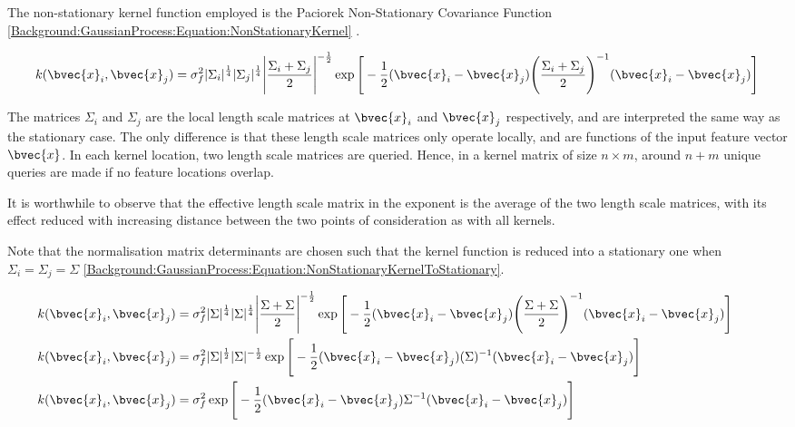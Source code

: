 				The non-stationary kernel function employed is the Paciorek Non-Stationary Covariance Function \eqref{Background:GaussianProcess:Equation:NonStationaryKernel} \citep{AdaptiveNonStationaryKernel}.
				
				\begin{equation}
					k(\bvec{x}_{i}, \bvec{x}_{j}) = \sigma_{f}^{2} |\Sigma_{i}|^{\frac{1}{4}} |\Sigma_{j}|^{\frac{1}{4}} \Bigg|\frac{\Sigma_{i} + \Sigma_{j}}{2}\Bigg|^{-\frac{1}{2}} \exp\Bigg[ -\frac{1}{2} (\bvec{x}_{i} - \bvec{x}_{j}) \Bigg(\frac{\Sigma_{i} + \Sigma_{j}}{2}\Bigg)^{-1} (\bvec{x}_{i} - \bvec{x}_{j}) \Bigg]
				\label{Background:GaussianProcess:Equation:NonStationaryKernel}
				\end{equation}			
				
				The matrices $\Sigma_{i}$ and $\Sigma_{j}$ are the local length scale matrices at $\bvec{x}_{i}$ and $\bvec{x}_{j}$ respectively, and are interpreted the same way as the stationary case. The only difference is that these length scale matrices only operate locally, and are functions of the input feature vector $\bvec{x}$. In each kernel location, two length scale matrices are queried. Hence, in a kernel matrix of size $n \times m$, around $n + m$ unique queries are made if no feature locations overlap.
				
				It is worthwhile to observe that the effective length scale matrix in the exponent is the average of the two length scale matrices, with its effect reduced with increasing distance between the two points of consideration as with all kernels.
				
				Note that the normalisation matrix determinants are chosen such that the kernel function is reduced into a stationary one when $\Sigma_{i} = \Sigma_{j} = \Sigma$ \eqref{Background:GaussianProcess:Equation:NonStationaryKernelToStationary}. 
				
				\begin{equation}
					\left.
						\begin{aligned}
							k(\bvec{x}_{i}, \bvec{x}_{j}) &= \sigma_{f}^{2} |\Sigma|^{\frac{1}{4}} |\Sigma|^{\frac{1}{4}} \Bigg|\frac{\Sigma + \Sigma}{2}\Bigg|^{-\frac{1}{2}} \exp\Bigg[ -\frac{1}{2} (\bvec{x}_{i} - \bvec{x}_{j}) \Bigg(\frac{\Sigma + \Sigma}{2}\Bigg)^{-1} (\bvec{x}_{i} - \bvec{x}_{j}) \Bigg] \\
							k(\bvec{x}_{i}, \bvec{x}_{j}) &= \sigma_{f}^{2} |\Sigma|^{\frac{1}{2}} |\Sigma|^{-\frac{1}{2}} \exp\Bigg[ -\frac{1}{2} (\bvec{x}_{i} - \bvec{x}_{j}) (\Sigma)^{-1} (\bvec{x}_{i} - \bvec{x}_{j}) \Bigg] \\
							k(\bvec{x}_{i}, \bvec{x}_{j}) &= \sigma_{f}^{2} \exp\Bigg[ -\frac{1}{2} (\bvec{x}_{i} - \bvec{x}_{j}) \Sigma^{-1} (\bvec{x}_{i} - \bvec{x}_{j}) \Bigg]
						\end{aligned}
					\qquad \right.
				\label{Background:GaussianProcess:Equation:NonStationaryKernelToStationary}
				\end{equation}		
				
